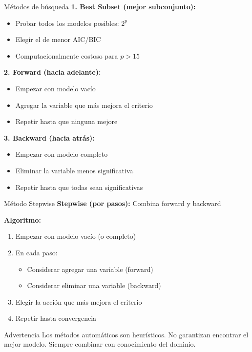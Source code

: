 \documentclass[aspectratio=169]{beamer}
\begin{document}
\begin{frame}{Métodos de búsqueda}
\textbf{1. Best Subset (mejor subconjunto):}
\begin{itemize}
    \item Probar todos los modelos posibles: $2^p$
    \item Elegir el de menor AIC/BIC
    \item Computacionalmente costoso para $p > 15$
\end{itemize}

\vspace{0.3cm}
\textbf{2. Forward (hacia adelante):}
\begin{itemize}
    \item Empezar con modelo vacío
    \item Agregar la variable que más mejora el criterio
    \item Repetir hasta que ninguna mejore
\end{itemize}

\vspace{0.3cm}
\textbf{3. Backward (hacia atrás):}
\begin{itemize}
    \item Empezar con modelo completo
    \item Eliminar la variable menos significativa
    \item Repetir hasta que todas sean significativas
\end{itemize}
\end{frame}

\begin{frame}{Método Stepwise}
\textbf{Stepwise (por pasos):} Combina forward y backward

\vspace{0.3cm}
\textbf{Algoritmo:}
\begin{enumerate}
    \item Empezar con modelo vacío (o completo)
    \item En cada paso:
    \begin{itemize}
        \item Considerar agregar una variable (forward)
        \item Considerar eliminar una variable (backward)
    \end{itemize}
    \item Elegir la acción que más mejora el criterio
    \item Repetir hasta convergencia
\end{enumerate}

\vspace{0.5cm}
\begin{alertblock}{Advertencia}
Los métodos automáticos son heurísticos. No garantizan encontrar el mejor modelo. Siempre combinar con conocimiento del dominio.
\end{alertblock}
\end{frame}
\end{document}
